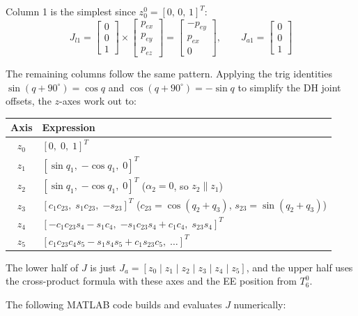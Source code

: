 \documentclass[12pt]{article}
\begin{document}
Column 1 is the simplest since $z_0^0 = [0,\,0,\,1]^T$:
\[
J_{l1} = \begin{bmatrix}0\\0\\1\end{bmatrix} \times
         \begin{bmatrix}p_{ex}\\p_{ey}\\p_{ez}\end{bmatrix}
       = \begin{bmatrix}-p_{ey}\\p_{ex}\\0\end{bmatrix},
\qquad
J_{a1} = \begin{bmatrix}0\\0\\1\end{bmatrix}
\]

The remaining columns follow the same pattern. Applying the trig
identities $\sin(q+90^\circ)=\cos q$ and $\cos(q+90^\circ)=-\sin q$
to simplify the DH joint offsets, the $z$-axes work out to:

\begin{center}
\renewcommand{\arraystretch}{1.4}
\begin{tabular}{cl}
\toprule
Axis & Expression \\
\midrule
$z_0$ & $[0,\;0,\;1]^T$ \\
$z_1$ & $[\sin q_1,\;{-\cos q_1},\;0]^T$ \\
$z_2$ & $[\sin q_1,\;{-\cos q_1},\;0]^T$ \quad ($\alpha_2=0$, so $z_2 \parallel z_1$) \\
$z_3$ & $[c_1 c_{23},\;s_1 c_{23},\;{-s_{23}}]^T$ \quad ($c_{23}=\cos(q_2+q_3)$, $s_{23}=\sin(q_2+q_3)$) \\
$z_4$ & $[{-c_1 c_{23} s_4 - s_1 c_4},\;{-s_1 c_{23} s_4 + c_1 c_4},\;s_{23} s_4]^T$ \\
$z_5$ & $[c_1 c_{23} c_4 s_5 - s_1 s_4 s_5 + c_1 s_{23} c_5,\;\ldots]^T$ \\
\bottomrule
\end{tabular}
\end{center}

The lower half of $J$ is just $J_a = [z_0\mid z_1\mid z_2\mid z_3\mid z_4\mid z_5]$,
and the upper half uses the cross-product formula with these axes and the
EE position from $T_6^0$.

The following MATLAB code builds and evaluates $J$ numerically:
\end{document}
